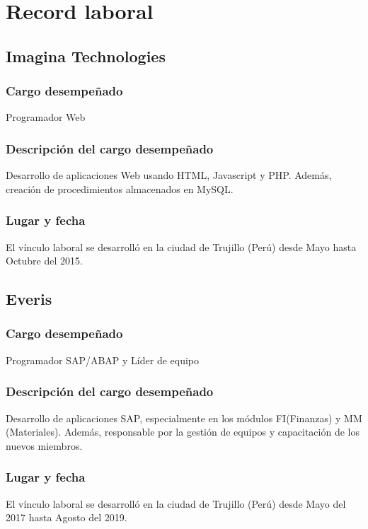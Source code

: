 \chapter{Record laboral}
\setcounter{page}{1}


\section{Imagina Technologies}


\subsection{Cargo desempeñado}
Programador Web

\subsection{Descripción del cargo desempeñado}
Desarrollo de aplicaciones Web usando HTML, Javascript y PHP. Además, creación de procedimientos almacenados en MySQL.

\subsection{Lugar y fecha}
El vínculo laboral se desarrolló en la ciudad de Trujillo (Perú) desde Mayo hasta Octubre del 2015.

\section{Everis}

\subsection{Cargo desempeñado}
Programador SAP/ABAP y Líder de equipo

\subsection{Descripción del cargo desempeñado}
Desarrollo de aplicaciones SAP, especialmente en los módulos FI(Finanzas) y MM (Materiales). Además, responsable por la gestión de equipos y capacitación de los nuevos miembros.

\subsection{Lugar y fecha}
El vínculo laboral se desarrolló en la ciudad de Trujillo (Perú) desde Mayo del 2017 hasta Agosto del 2019.

